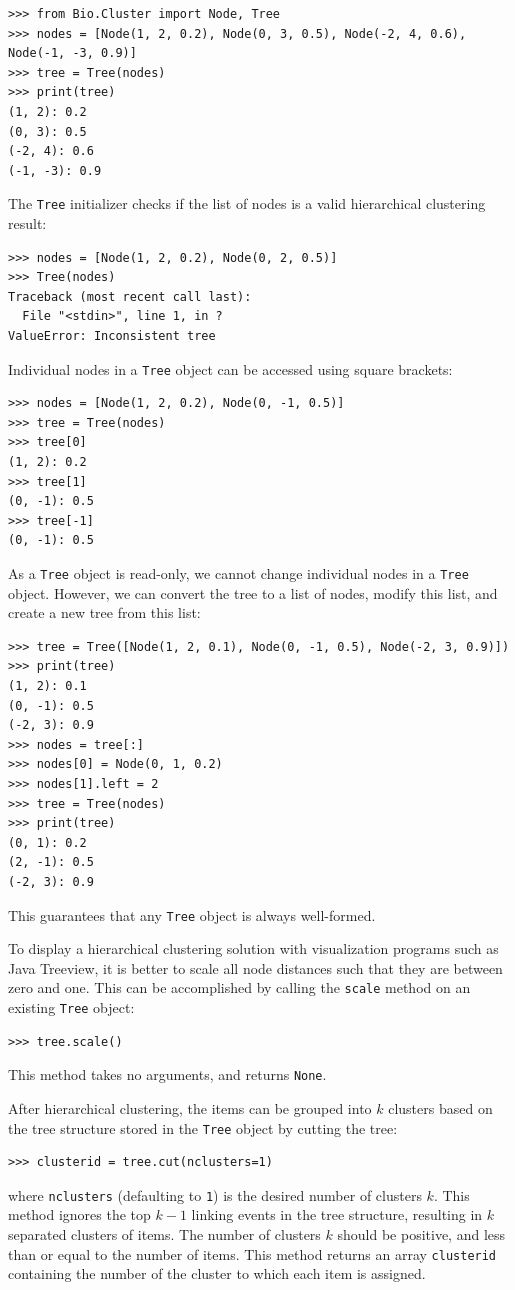 \documentclass{report}
\begin{document}
\begin{verbatim}
>>> from Bio.Cluster import Node, Tree
>>> nodes = [Node(1, 2, 0.2), Node(0, 3, 0.5), Node(-2, 4, 0.6), Node(-1, -3, 0.9)]
>>> tree = Tree(nodes)
>>> print(tree)
(1, 2): 0.2
(0, 3): 0.5
(-2, 4): 0.6
(-1, -3): 0.9
\end{verbatim}

The \verb|Tree| initializer checks if the list of nodes is a valid hierarchical clustering result:

\begin{verbatim}
>>> nodes = [Node(1, 2, 0.2), Node(0, 2, 0.5)]
>>> Tree(nodes)
Traceback (most recent call last):
  File "<stdin>", line 1, in ?
ValueError: Inconsistent tree
\end{verbatim}

Individual nodes in a \verb|Tree| object can be accessed using square brackets:

\begin{verbatim}
>>> nodes = [Node(1, 2, 0.2), Node(0, -1, 0.5)]
>>> tree = Tree(nodes)
>>> tree[0]
(1, 2): 0.2
>>> tree[1]
(0, -1): 0.5
>>> tree[-1]
(0, -1): 0.5
\end{verbatim}

As a \verb|Tree| object is read-only, we cannot change individual nodes in a \verb|Tree| object. However, we can convert the tree to a list of nodes, modify this list, and create a new tree from this list:

\begin{verbatim}
>>> tree = Tree([Node(1, 2, 0.1), Node(0, -1, 0.5), Node(-2, 3, 0.9)])
>>> print(tree)
(1, 2): 0.1
(0, -1): 0.5
(-2, 3): 0.9
>>> nodes = tree[:]
>>> nodes[0] = Node(0, 1, 0.2)
>>> nodes[1].left = 2
>>> tree = Tree(nodes)
>>> print(tree)
(0, 1): 0.2
(2, -1): 0.5
(-2, 3): 0.9
\end{verbatim}

This guarantees that any \verb|Tree| object is always well-formed. 

To display a hierarchical clustering solution with visualization programs such as Java Treeview, it is better to scale all node distances such that they are between zero and one. This can be accomplished by calling the \verb|scale| method on an existing \verb|Tree| object:
\begin{verbatim}
>>> tree.scale()
\end{verbatim}
This method takes no arguments, and returns \verb|None|.

After hierarchical clustering, the items can be grouped into $k$ clusters based on the tree structure stored in the \verb|Tree| object by cutting the tree:
\begin{verbatim}
>>> clusterid = tree.cut(nclusters=1)
\end{verbatim}
where \verb|nclusters| (defaulting to \verb|1|) is the desired number of clusters $k$.
This method ignores the top $k-1$ linking events in the tree structure, resulting in $k$ separated clusters of items. The number of clusters $k$ should be positive, and less than or equal to the number of items.
This method returns an array \verb|clusterid| containing the number of the cluster to which each item is assigned.
\end{document}
